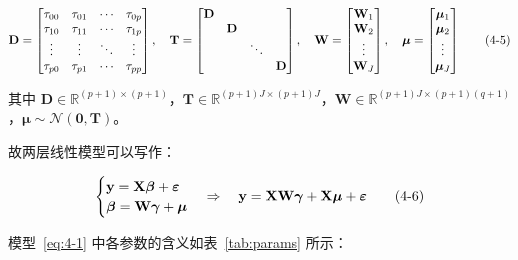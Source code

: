 \documentclass[12pt,a4paper]{ctexart}
\makeatletter
\numberwithin{figure}{section}
\numberwithin{table}{section}
\let\ltx@orig@tag\tag
\renewcommand{\tag}[1]{\refstepcounter{equation}\ltx@orig@tag{#1}}%
\makeatother
\begin{document}
\begin{equation}
\mathbf{D} = \begin{bmatrix} \tau_{00} & \tau_{01} & \cdots & \tau_{0p} \\ \tau_{10} & \tau_{11} & \cdots & \tau_{1p} \\ \vdots & \vdots & \ddots & \vdots \\ \tau_{p0} & \tau_{p1} & \cdots & \tau_{pp} \end{bmatrix}, \quad
\mathbf{T} = \begin{bmatrix} \mathbf{D} & & & \\ & \mathbf{D} & & \\ & & \ddots & \\ & & & \mathbf{D} \end{bmatrix}, \quad
\mathbf{W} = \begin{bmatrix} \mathbf{W}_1 \\ \mathbf{W}_2 \\ \vdots \\ \mathbf{W}_J \end{bmatrix}, \quad
\boldsymbol{\mu} = \begin{bmatrix} \boldsymbol{\mu}_1 \\ \boldsymbol{\mu}_2 \\ \vdots \\ \boldsymbol{\mu}_J \end{bmatrix}
\tag{4-5}
\end{equation}

其中 $\mathbf{D} \in \mathbb{R}^{(p+1) \times (p+1)}$，$\mathbf{T} \in \mathbb{R}^{(p+1)J \times (p+1)J}$，$\mathbf{W} \in \mathbb{R}^{(p+1)J \times (p+1)(q+1)}$，$\boldsymbol{\mu} \sim \mathcal{N}(\mathbf{0}, \mathbf{T})$。

故两层线性模型可以写作：

\begin{equation}
\begin{cases} \mathbf{y} = \mathbf{X}\boldsymbol{\beta} + \boldsymbol{\varepsilon} \\ \boldsymbol{\beta} = \mathbf{W}\boldsymbol{\gamma} + \boldsymbol{\mu} \end{cases} \Rightarrow \quad \mathbf{y} = \mathbf{X}\mathbf{W}\boldsymbol{\gamma} + \mathbf{X}\boldsymbol{\mu} + \boldsymbol{\varepsilon}
\tag{4-6}
\end{equation}

模型~\eqref{eq:4-1} 中各参数的含义如表~\ref{tab:params} 所示：
\end{document}
